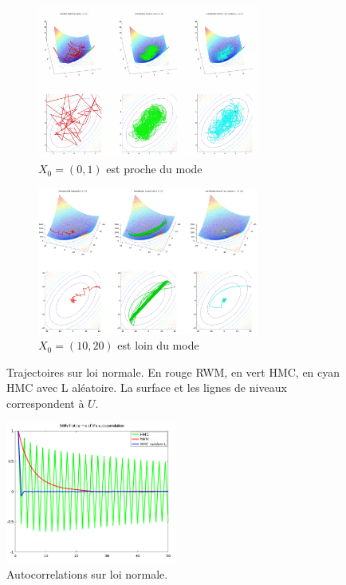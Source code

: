 \documentclass[10pt,a4paper]{article}
\begin{document}
\begin{figure}[hp]
  \begin{subfigure}{\textwidth}  
    \centering
    \includegraphics[width=0.8\textwidth]{figs/normal.png}
    \caption{$X_0 = (0,1)$ est proche du mode}  
  \end{subfigure}

  \begin{subfigure}{\textwidth}  
    \centering
    \includegraphics[width=0.8\textwidth]{figs/normal_far.png}
    \caption{$X_0 = (10, 20)$ est loin du mode}  
  \end{subfigure}
  \caption{Trajectoires sur loi normale. En rouge RWM, en vert HMC, en cyan HMC avec L aléatoire. La surface et les lignes de niveaux correspondent à $U$. \label{fig:normal}}
\end{figure}

\begin{figure}[ht]
  \centering
  \includegraphics[width=0.5\textwidth]{figs/normal_autocor.png}
  \caption{Autocorrelations sur loi normale. \label{fig:normal_autocor}}
\end{figure}
\end{document}
